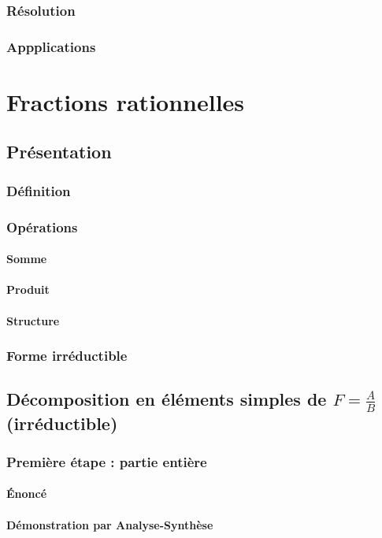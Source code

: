 \documentclass[12pt,a4paper,french]{book}
\begin{document}
		\subsection{Résolution}
		\subsection{Appplications}
		
\chapter{Fractions rationnelles}
	\section{Présentation}
		\subsection{Définition}
		\subsection{Opérations}
			\subsubsection{Somme}
			\subsubsection{Produit}
			\subsubsection{Structure}
		\subsection{Forme irréductible}
	\section{Décomposition en éléments simples de $F = \frac{A}{B}$ (irréductible)}
		\subsection{Première étape : partie entière}
			\subsubsection{Énoncé}
			\subsubsection{Démonstration par Analyse-Synthèse}
\end{document}

